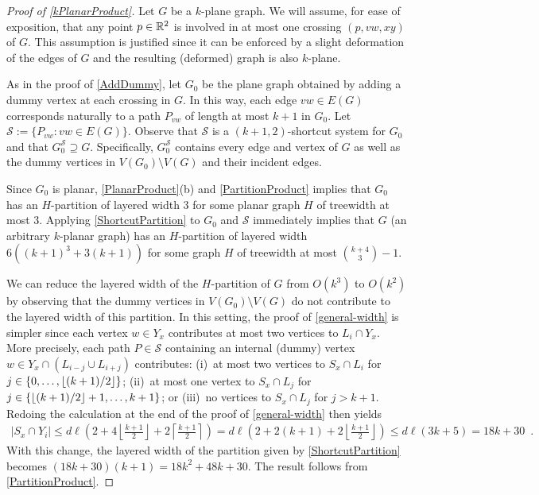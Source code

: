 \documentclass{patmorin}
\DeclarePairedDelimiter{\floor}{\lfloor}{\rfloor}
\renewcommand{\SS}{\mathcal{S}}
\renewcommand{\le}{\leqslant}
\begin{document}
\begin{proof}[Proof of \cref{kPlanarProduct}]
	Let $G$ be a $k$-plane graph.  We will assume, for ease of exposition, that any point $p\in\mathbb{R}^2$ is involved in at most one crossing $(p,vw,xy)$ of $G$. This assumption is justified since it can be enforced by a slight deformation of the edges of $G$ and the resulting (deformed) graph is also $k$-plane.

	As in the proof of \cref{AddDummy}, let $G_0$ be the plane graph obtained by adding a dummy vertex at each crossing in $G$. In this way, each edge $vw\in E(G)$ corresponds naturally to a path $P_{vw}$ of length at most $k+1$ in $G_0$.  Let $\SS := \{P_{vw}: vw\in E(G)\}$. Observe that $\SS$ is a $(k+1,2)$-shortcut system for $G_0$ and that $G_0^{\SS}\supseteq G$.  Specifically, $G_0^{\SS}$ contains every edge and vertex of $G$ as well as the dummy vertices in $V(G_0)\setminus V(G)$ and their incident edges.

	Since $G_0$ is planar,  \cref{PlanarProduct}(b) and \cref{PartitionProduct} implies that $G_0$ has an $H$-partition of layered width 3 for some planar graph $H$ of treewidth at most 3.  Applying \cref{ShortcutPartition} to $G_0$ and $\SS$ immediately implies that $G$ (an arbitrary $k$-planar graph) has an $H$-partition of layered width $6((k+1)^3+3(k+1))$ for some graph $H$ of treewidth at most $\binom{k+4}{3}-1$.

	We can reduce the layered width of the $H$-partition of $G$ from $O(k^3)$ to $O(k^2)$ by observing that the dummy vertices in $V(G_0)\setminus V(G)$ do not contribute to the layered width of this partition.  In this setting, the proof of \cref{general-width} is simpler since each vertex $w\in Y_x$ contributes at most two vertices to $L_i\cap Y_x$.  More precisely, each path $P\in\SS$ containing an internal (dummy) vertex $w\in Y_x\cap (L_{i-j}\cup L_{i+j})$ contributes: (i)~at most two vertices to $S_x\cap L_i$ for $j\in\{0,\ldots,\floor{(k+1)/2}\}$; (ii)~at most one vertex to $S_x\cap L_j$ for $j\in\{\floor{(k+1)/2}+1,\ldots,k+1\}$; or (iii)~no vertices to $S_x\cap L_j$ for $j > k+1$.
	Redoing the calculation at the end of the proof of \cref{general-width} then yields
	\begin{align*}
	|S_x\cap Y_i| \le d\ell\left(
	2
	+ 4\left\lfloor\tfrac{k+1}{2}\right\rfloor
	+ 2\left\lceil\tfrac{k+1}{2}\right\rceil
	\right)
	 =
	d\ell\left(
	2 + 2(k+1) + 2\left\lfloor\tfrac{k+1}{2}\right\rfloor
	\right)
	 \le
	d\ell(3k+5)
	= 18k+30 \enspace .
	\end{align*}
	With this change, the layered width of the partition given by \cref{ShortcutPartition} becomes $(18k+30)(k+1)=18k^2+48k+30$.
	The result follows from \cref{PartitionProduct}.
\end{proof}
\end{document}
